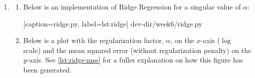 \documentclass{article}
\begin{document}
\begin{enumerate}[leftmargin={*}, font={\bf}, label={\arabic*.}, ref={\arabic*}]
\begin{enumerate}[label={(\Alph*)}, ref={\theenumi(\Alph*)}]
\begin{enumerate}[label={(\roman*)}, ref={\theenumii(\roman*)}]
          \item
            The mean squared error across the testing set is approximately {\bf
            3772.52}.
            
          \item
            Compared to the canonical {\sf Linear Regressor} from \ref{qst:1B}, the
            {\sf Polynomial Regressor} is catastrophically overfitting the training
            observations and generalizing poorly on the test set.
        \end{enumerate}
        
      \item \label{qst:1E}
        \begin{enumerate}[label={(\roman*)}, ref={\theenumii(\roman*)}]
          \item
            Below is an implementation of {\sf Ridge Regression} for a singular value
            of $\alpha$:
            
              [caption={\sf ridge.py}, label={lst:ridge}]
              {dev-dir/week6/ridge.py}
          
          \item
            Below is a plot with the regularization factor, $\alpha$, on the $x$-axis
            ($\log$ scale) and the mean squared error (without regularization penalty)
            on the $y$-axis. See \autoref{lst:ridge-mse} for a fuller explanation on
            how this figure has been generated.
            \begin{figure}[H]
              \centering
            \end{figure}
        \end{enumerate}
        

\end{enumerate}
\end{enumerate}
\end{document}
